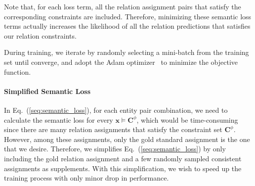 Note that, for each loss term, all the relation assignment pairs that satisfy the corresponding constraints are included.
Therefore, minimizing these semantic loss terms actually increases the likelihood of all the relation predictions that satisfies our relation constraints.

During training, we iterate by randomly selecting a mini-batch from the training set until converge, and adopt the Adam optimizer~\cite{kingma2014adam} to minimize the objective function.
\paragraph{Simplified Semantic Loss}
In Eq.~(\ref{seq:semantic_loss}), for each entity pair combination, we need to calculate the semantic loss for every $\bm x \models \bm{C}^{\phi}$, which would be time-consuming since there are many relation assignments that satisfy the constraint set $\bm{C}^{\phi}$.
However, among these assignments, only the gold standard assignment is the one that we desire.
Therefore, we simplifies Eq.~(\ref{seq:semantic_loss}) by only including the gold relation assignment and a few randomly sampled consistent assignments as supplements.
With this simplification, we wish to speed up the training process with only minor drop in performance.





